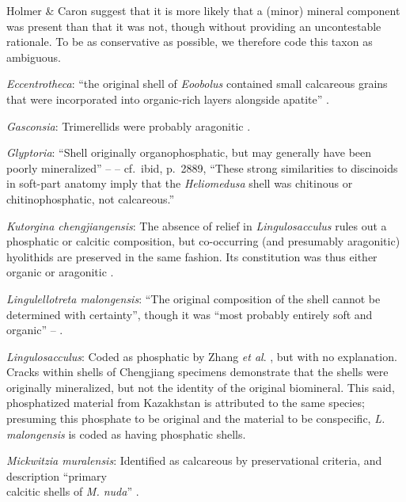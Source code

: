 \documentclass[openany]{book}
\theoremstyle{definition}
\theoremstyle{definition}
\theoremstyle{definition}
\theoremstyle{remark}
\begin{document}
Holmer \& Caron \citeyearpar[p.~286]{Holmer2006Aspinose} suggest that it
is more likely that a (minor) mineral component was present than that it
was not, though without providing an uncontestable rationale. To be as
conservative as possible, we therefore code this taxon as ambiguous.

\hypertarget{Eccentrotheca-coding-122}{}
\emph{Eccentrotheca}: ``the original shell of \emph{Eoobolus} contained
small calcareous grains that were incorporated into organic-rich layers
alongside apatite'' \citep{Balthasar2007Anearly}.

\hypertarget{Gasconsia-coding-122}{}
\emph{Gasconsia}: Trimerellids were probably aragonitic
\citep{Williams2000LinguliformeaCraniiformea}.

\hypertarget{Glyptoria-coding-122}{}
\emph{Glyptoria}: ``Shell originally organophosphatic, but may generally
have been poorly mineralized'' -- \citet{Williams2007Supplement} --
cf.~ibid, p.~2889, ``These strong similarities to discinoids in
soft-part anatomy imply that the \emph{Heliomedusa} shell was chitinous
or chitinophosphatic, not calcareous.''

\hypertarget{Kutorgina_chengjiangensis-coding-122}{}
\emph{Kutorgina chengjiangensis}: The absence of relief in
\emph{Lingulosacculus} rules out a phosphatic or calcitic composition,
but co-occurring (and presumably aragonitic) hyolithids are preserved in
the same fashion. Its constitution was thus either organic or aragonitic
\citep{Balthasar2009EarlyCambrian}.

\hypertarget{Lingulellotreta_malongensis-coding-122}{}
\emph{Lingulellotreta malongensis}: ``The original composition of the
shell cannot be determined with certainty'', though it was ``most
probably entirely soft and organic'' --
\citet{Zhang2011Theexceptionally}.

\hypertarget{Lingulosacculus-coding-122}{}
\emph{Lingulosacculus}: Coded as phosphatic by Zhang \emph{et al}.
\citeyearpar{Zhang2014Anearly}, but with no explanation.\\
Cracks within shells of Chengjiang specimens \citep[e.g.][fig.
3]{Zhang2007Noteon} demonstrate that the shells were originally
mineralized, but not the identity of the original biomineral. This said,
phosphatized material from Kazakhstan \citep{Holmer1997EarlyCambrian} is
attributed to the same species; presuming this phosphate to be original
and the material to be conspecific, \emph{L. malongensis} is coded as
having phosphatic shells.

\hypertarget{Mickwitzia_muralensis-coding-122}{}
\emph{Mickwitzia muralensis}: Identified as calcareous by preservational
criteria, and description ``primary\\
calcitic shells of \emph{M. nuda}'' \citep{Balthasar2008iMummpikia}.
\end{document}
